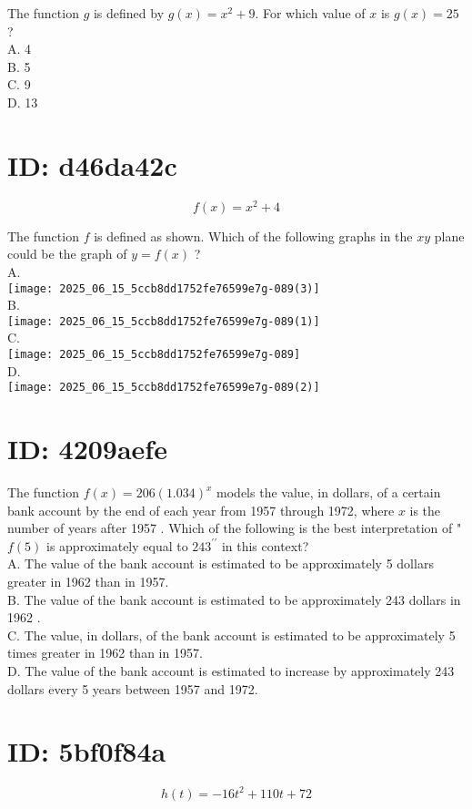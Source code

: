 The function $g$ is defined by $g(x)=x^{2}+9$. For which value of $x$ is $g(x)=25$ ?\\
A. 4\\
B. 5\\
C. 9\\
D. 13

\section*{ID: d46da42c}
$$
f(x)=x^{2}+4
$$

The function $f$ is defined as shown. Which of the following graphs in the $x y$ plane could be the graph of $y=f(x)$ ?\\
A.\\
\texttt{[image: 2025\_06\_15\_5ccb8dd1752fe76599e7g-089(3)]}\\
B.\\
\texttt{[image: 2025\_06\_15\_5ccb8dd1752fe76599e7g-089(1)]}\\
C.\\
\texttt{[image: 2025\_06\_15\_5ccb8dd1752fe76599e7g-089]}\\
D.\\
\texttt{[image: 2025\_06\_15\_5ccb8dd1752fe76599e7g-089(2)]}

\section*{ID: 4209aefe}
The function $f(x)=206(1.034)^{x}$ models the value, in dollars, of a certain bank account by the end of each year from 1957 through 1972, where $x$ is the number of years after 1957 . Which of the following is the best interpretation of " $f(5)$ is approximately equal to $243^{\prime \prime}$ in this context?\\
A. The value of the bank account is estimated to be approximately 5 dollars greater in 1962 than in 1957.\\
B. The value of the bank account is estimated to be approximately 243 dollars in 1962 .\\
C. The value, in dollars, of the bank account is estimated to be approximately 5 times greater in 1962 than in 1957.\\
D. The value of the bank account is estimated to increase by approximately 243 dollars every 5 years between 1957 and 1972.

\section*{ID: 5bf0f84a}
$$
h(t)=-16 t^{2}+110 t+72
$$

